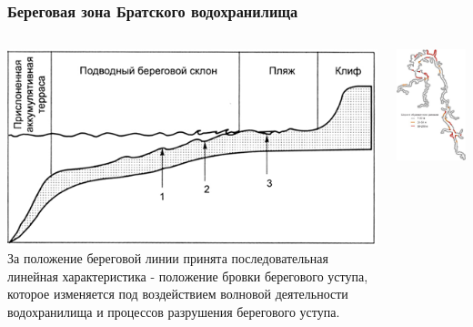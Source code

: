 \documentclass[handout]{beamer}
\begin{document}
\begin{frame}[fragile]
  \frametitle{Береговая зона Братского водохранилища}
  \begin{columns}
    \begin{column}{0.5\linewidth}
      \includegraphics[width=\linewidth]{shore-struct-base.png}
      За положение береговой линии
принята последовательная линейная характеристика - положение бровки берегового уступа,  которое изменяется под воздействием волновой деятельности водохранилища и процессов разрушения берегового уступа.
    \end{column}
    \begin{column}{0.5\linewidth}
      \includegraphics[width=\linewidth]{bratsk-reserv-shores.jpeg}

\end{column}
\end{columns}
\end{frame}
\end{document}
